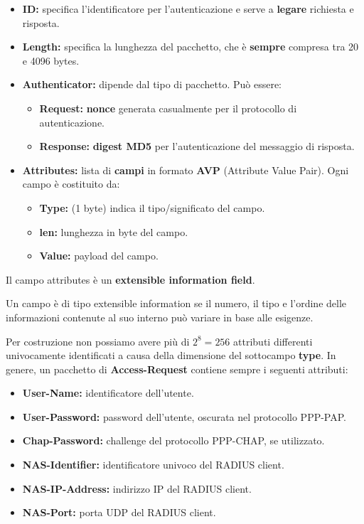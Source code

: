 \begin{itemize}
    \item \textbf{ID:} specifica l'identificatore per l'autenticazione e serve a \textbf{legare} richiesta e risposta.
    \item \textbf{Length:} specifica la lunghezza del pacchetto, che è \textbf{sempre} compresa tra 20 e 4096 bytes.
    \item \textbf{Authenticator:} dipende dal tipo di pacchetto. Può essere:
    \begin{itemize}
        \item \textbf{Request:} \textbf{nonce} generata casualmente per il protocollo di autenticazione.
        \item \textbf{Response:} \textbf{digest MD5} per l'autenticazione del messaggio di risposta.
    \end{itemize}
    \item \textbf{Attributes:} lista di \textbf{campi} in formato \textbf{AVP} (Attribute Value Pair). Ogni campo è costituito da:
    \begin{itemize}
        \item \textbf{Type:} (1 byte) indica il tipo/significato del campo.
        \item \textbf{len:} lunghezza in byte del campo.
        \item \textbf{Value:} payload del campo.
    \end{itemize}
\end{itemize}
\begin{remark}
Il campo attributes è un \textbf{extensible information field}.
\end{remark}
\begin{definition}
Un campo è di tipo extensible information se il numero, il tipo e l'ordine delle informazioni contenute al suo interno può variare in base alle esigenze.
\end{definition}
\begin{remark}
Per costruzione non possiamo avere più di $2^8=256$ attributi differenti univocamente identificati a causa della dimensione del sottocampo \textbf{type}. In genere, un pacchetto di \textbf{Access-Request} contiene sempre i seguenti attributi:
\begin{itemize}
    \item \textbf{User-Name:} identificatore dell'utente.
    \item \textbf{User-Password:} password dell'utente, oscurata nel protocollo PPP-PAP.
    \item \textbf{Chap-Password:} challenge del protocollo PPP-CHAP, se utilizzato.
    \item \textbf{NAS-Identifier:} identificatore univoco del RADIUS client.
    \item \textbf{NAS-IP-Address:} indirizzo IP del RADIUS client.
    \item \textbf{NAS-Port:} porta UDP del RADIUS client.
\end{itemize}
\end{remark}

